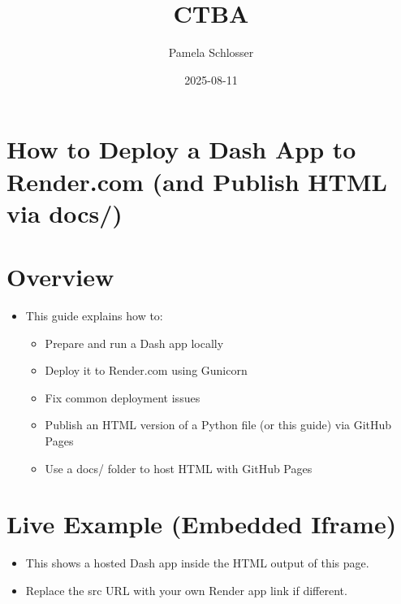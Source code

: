 \documentclass[
  letterpaper,
  DIV=11,
  numbers=noendperiod]{scrreprt}
\title{CTBA}
\author{Pamela Schlosser}
\date{2025-08-11}
\providecommand{\tightlist}{%
  \setlength{\itemsep}{0pt}\setlength{\parskip}{0pt}}\usepackage{longtable,booktabs,array}
\renewcommand*\contentsname{Table of contents}
\newcommand\contentsname{Table of contents}
\begin{document}
\maketitle

\renewcommand*\contentsname{Table of contents}
{
\hypersetup{linkcolor=}
\setcounter{tocdepth}{2}
\tableofcontents
}


\chapter{How to Deploy a Dash App to Render.com (and Publish HTML via
docs/)}\label{how-to-deploy-a-dash-app-to-render.com-and-publish-html-via-docs}


\chapter{Overview}\label{overview}

\begin{itemize}
\tightlist
\item
  This guide explains how to:

  \begin{itemize}
  \tightlist
  \item
    Prepare and run a Dash app locally
  \item
    Deploy it to Render.com using Gunicorn
  \item
    Fix common deployment issues
  \item
    Publish an HTML version of a Python file (or this guide) via GitHub
    Pages
  \item
    Use a docs/ folder to host HTML with GitHub Pages
  \end{itemize}
\end{itemize}


\chapter{Live Example (Embedded
Iframe)}\label{live-example-embedded-iframe}

\begin{itemize}
\tightlist
\item
  This shows a hosted Dash app inside the HTML output of this page.
\item
  Replace the src URL with your own Render app link if different.
\end{itemize}
\end{document}
